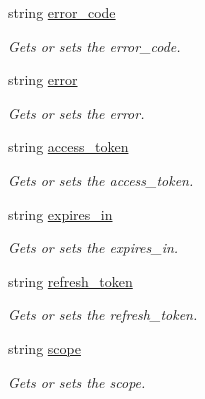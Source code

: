 \begin{DoxyCompactItemize}
\item 
string \mbox{\hyperlink{class_t_net_1_1_sns_1_1_login360___v2_1_1_s_d_k360_get_token_error_a0f76c92a6eaf05647b7d458bc5ae10e8}{error\+\_\+code}}
\begin{DoxyCompactList}\small\item\em Gets or sets the error\+\_\+code. \end{DoxyCompactList}\item 
string \mbox{\hyperlink{class_t_net_1_1_sns_1_1_login360___v2_1_1_s_d_k360_get_token_error_a2b2671a47d13d6a467e37ae894282083}{error}}
\begin{DoxyCompactList}\small\item\em Gets or sets the error. \end{DoxyCompactList}\item 
string \mbox{\hyperlink{class_t_net_1_1_sns_1_1_login360___v2_1_1_s_d_k360_get_token_error_ad32042a9e29ff55b7e34db2c855f9be8}{access\+\_\+token}}
\begin{DoxyCompactList}\small\item\em Gets or sets the access\+\_\+token. \end{DoxyCompactList}\item 
string \mbox{\hyperlink{class_t_net_1_1_sns_1_1_login360___v2_1_1_s_d_k360_get_token_error_aa5d9ac9dd475c6c2b0c0682db92ea6de}{expires\+\_\+in}}
\begin{DoxyCompactList}\small\item\em Gets or sets the expires\+\_\+in. \end{DoxyCompactList}\item 
string \mbox{\hyperlink{class_t_net_1_1_sns_1_1_login360___v2_1_1_s_d_k360_get_token_error_a7bc8786d230d89f8bfb5f9dc94586012}{refresh\+\_\+token}}
\begin{DoxyCompactList}\small\item\em Gets or sets the refresh\+\_\+token. \end{DoxyCompactList}\item 
string \mbox{\hyperlink{class_t_net_1_1_sns_1_1_login360___v2_1_1_s_d_k360_get_token_error_a021fb9665f3010db8bf348789cc8eb7c}{scope}}
\begin{DoxyCompactList}\small\item\em Gets or sets the scope. \end{DoxyCompactList}\end{DoxyCompactItemize}


